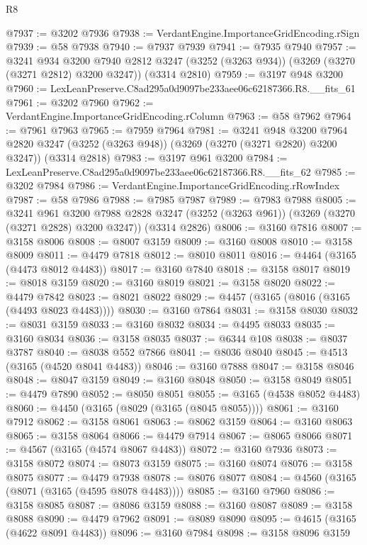 \begin{lexlean}{R8}
\begin{coremodule}
@7937 := @3202 @7936
@7938 := VerdantEngine.ImportanceGridEncoding.rSign
@7939 := @58 @7938
@7940 := @7937 @7939
@7941 := @7935 @7940
@7957 := @3241
    @934
    @3200
    @7940
    @2812
    @3247
    (@3252 (@3263 @934))
    (@3269 (@3270 (@3271 @2812) @3200 @3247))
    (@3314 @2810)
@7959 := @3197 @948 @3200
@7960 := LexLeanPreserve.C8ad295a0d9097be233aee06c62187366.R8.__fits_61
@7961 := @3202 @7960
@7962 := VerdantEngine.ImportanceGridEncoding.rColumn
@7963 := @58 @7962
@7964 := @7961 @7963
@7965 := @7959 @7964
@7981 := @3241
    @948
    @3200
    @7964
    @2820
    @3247
    (@3252 (@3263 @948))
    (@3269 (@3270 (@3271 @2820) @3200 @3247))
    (@3314 @2818)
@7983 := @3197 @961 @3200
@7984 := LexLeanPreserve.C8ad295a0d9097be233aee06c62187366.R8.__fits_62
@7985 := @3202 @7984
@7986 := VerdantEngine.ImportanceGridEncoding.rRowIndex
@7987 := @58 @7986
@7988 := @7985 @7987
@7989 := @7983 @7988
@8005 := @3241
    @961
    @3200
    @7988
    @2828
    @3247
    (@3252 (@3263 @961))
    (@3269 (@3270 (@3271 @2828) @3200 @3247))
    (@3314 @2826)
@8006 := @3160 @7816
@8007 := @3158 @8006
@8008 := @8007 @3159
@8009 := @3160 @8008
@8010 := @3158 @8009
@8011 := @4479 @7818
@8012 := @8010 @8011
@8016 := @4464 (@3165 (@4473 @8012 @4483))
@8017 := @3160 @7840
@8018 := @3158 @8017
@8019 := @8018 @3159
@8020 := @3160 @8019
@8021 := @3158 @8020
@8022 := @4479 @7842
@8023 := @8021 @8022
@8029 := @4457 (@3165 (@8016 (@3165 (@4493 @8023 @4483))))
@8030 := @3160 @7864
@8031 := @3158 @8030
@8032 := @8031 @3159
@8033 := @3160 @8032
@8034 := @4495 @8033
@8035 := @3160 @8034
@8036 := @3158 @8035
@8037 := @6344 @108
@8038 := @8037 @3787
@8040 := @8038 @552 @7866
@8041 := @8036 @8040
@8045 := @4513 (@3165 (@4520 @8041 @4483))
@8046 := @3160 @7888
@8047 := @3158 @8046
@8048 := @8047 @3159
@8049 := @3160 @8048
@8050 := @3158 @8049
@8051 := @4479 @7890
@8052 := @8050 @8051
@8055 := @3165 (@4538 @8052 @4483)
@8060 := @4450 (@3165 (@8029 (@3165 (@8045 @8055))))
@8061 := @3160 @7912
@8062 := @3158 @8061
@8063 := @8062 @3159
@8064 := @3160 @8063
@8065 := @3158 @8064
@8066 := @4479 @7914
@8067 := @8065 @8066
@8071 := @4567 (@3165 (@4574 @8067 @4483))
@8072 := @3160 @7936
@8073 := @3158 @8072
@8074 := @8073 @3159
@8075 := @3160 @8074
@8076 := @3158 @8075
@8077 := @4479 @7938
@8078 := @8076 @8077
@8084 := @4560 (@3165 (@8071 (@3165 (@4595 @8078 @4483))))
@8085 := @3160 @7960
@8086 := @3158 @8085
@8087 := @8086 @3159
@8088 := @3160 @8087
@8089 := @3158 @8088
@8090 := @4479 @7962
@8091 := @8089 @8090
@8095 := @4615 (@3165 (@4622 @8091 @4483))
@8096 := @3160 @7984
@8098 := @3158 @8096 @3159

\end{coremodule}
\end{lexlean}
